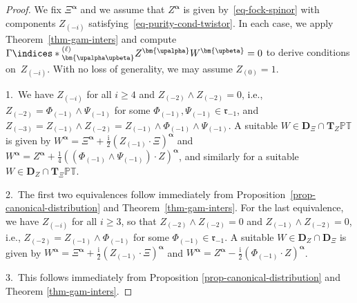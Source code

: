 \documentclass[10pt,a4paper]{amsart}
\numberwithin{equation}{section}
\newcommand{\mbf} [1]{\mathbf{#1}}
\newcommand{\ii} {\mathrm{i}}
\newcommand{\ind} {\indices}
\newcommand{\mfr} {\mathfrak{r}}
\newcommand{\PT} {\mathbb{PT}}
\begin{document}
\begin{proof} We f\/ix $\Xi^{\bm{\upalpha}}$ and we assume that $Z^{\bm{\upalpha}}$ is given by~\eqref{eq-fock-spinor} with components $Z_{(-i)}$ satis\-fying~\eqref{eq-purity-cond-twistor}. In each case, we apply Theorem~\ref{thm-gam-inters} and compute $\Gamma \ind*{^{(\ell)}_{\bm{\upalpha \upbeta}}} Z^{\bm{\upalpha}} W^{\bm{\upbeta}} = 0$ to derive conditions on~$Z_{(-i)}$. With no loss of generality, we may assume $Z_{(0)} = 1$.

1.~We have $Z_{(-i)}$ for all $i\geq4$ and $Z_{(-2)} \wedge Z_{(-2)} = 0$, i.e., $Z_{(-2)} = \Phi_{(-1)} \wedge \Psi_{(-1)}$ for some $\Phi_{(-1)} , \Psi_{(-1)} \in \mfr_{-1}$, and $Z_{(-3)} = Z_{(-1)} \wedge Z_{(-2)} = Z_{(-1)} \wedge \Phi_{(-1)} \wedge \Psi_{(-1)}$. A suitable $W \in \mbf{D}_\Xi \cap \mbf{T}_Z \PT$ is given by $W^{\bm{\upalpha}} = \Xi^{\bm{\upalpha}} + \frac{\ii}{2} ( Z_{(-1)} \cdot \Xi)^{\bm{\upalpha}}$ and $W^{\bm{\upalpha}} = Z^{\bm{\upalpha}} + \frac{1}{4} (( \Phi_{(-1)} \wedge \Psi_{(-1)} ) \cdot Z)^{\bm{\upalpha}}$, and similarly for a suitable $W \in \mbf{D}_Z \cap \mbf{T}_\Xi \PT$.

2.~The f\/irst two equivalences follow immediately from Proposition~\ref{prop-canonical-distribution} and Theorem~\ref{thm-gam-inters}. For the last equivalence, we have $Z_{(-i)}$ for all $i\geq3$, so that $Z_{(-2)} \wedge Z_{(-2)} = 0$ and $Z_{(-1)} \wedge Z_{(-2)} = 0$, i.e., $Z_{(-2)} = Z_{(-1)} \wedge \Phi_{(-1)}$ for some $\Phi_{(-1)} \in \mfr_{-1}$. A suitable $W \in \mbf{D}_Z \cap \mbf{D}_\Xi$ is given by $W^{\bm{\upalpha}} = \Xi^{\bm{\upalpha}} + \frac{\ii}{2} ( Z_{(-1)} \cdot \Xi )^{\bm{\upalpha}}$ and $W^{\bm{\upalpha}} = Z^{\bm{\upalpha}} - \frac{\ii}{2} ( \Phi_{(-1)} \cdot Z )^{\bm{\upalpha}}$.

3.~This follows immediately from Proposition \ref{prop-canonical-distribution} and Theorem \ref{thm-gam-inters}.
\end{proof}
\end{document}
